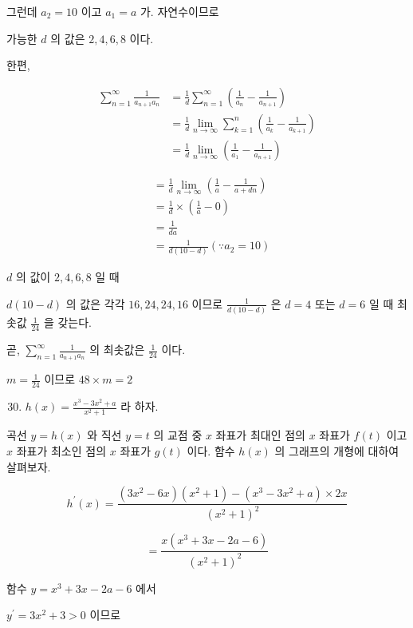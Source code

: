 \documentclass[10pt]{article}
\begin{document}
그런데 $a_{2}=10$ 이고 $a_{1}=a$ 가. 자연수이므로

가능한 $d$ 의 값은 $2,4,6,8$ 이다.

한편,

\[
\begin{aligned}
\sum_{n=1}^{\infty} \frac{1}{a_{n+1} a_{n}} & =\frac{1}{d} \sum_{n=1}^{\infty}\left(\frac{1}{a_{n}}-\frac{1}{a_{n+1}}\right) \\
& =\frac{1}{d} \lim _{n \rightarrow \infty} \sum_{k=1}^{n}\left(\frac{1}{a_{k}}-\frac{1}{a_{k+1}}\right) \\
& =\frac{1}{d} \lim _{n \rightarrow \infty}\left(\frac{1}{a_{1}}-\frac{1}{a_{n+1}}\right)
\end{aligned}
\]

\[
\begin{aligned}
& =\frac{1}{d} \lim _{n \rightarrow \infty}\left(\frac{1}{a}-\frac{1}{a+d n}\right) \\
& =\frac{1}{d} \times\left(\frac{1}{a}-0\right) \\
& =\frac{1}{d a} \\
& =\frac{1}{d(10-d)}\left(\because a_{2}=10\right)
\end{aligned}
\]

$d$ 의 값이 $2,4,6,8$ 일 때

$d(10-d)$ 의 값은 각각 $16,24,24,16$ 이므로 $\frac{1}{d(10-d)}$ 은 $d=4$ 또는 $d=6$ 일 때 최솟값 $\frac{1}{24}$ 을 갖는다.

곧, $\sum_{n=1}^{\infty} \frac{1}{a_{n+1} a_{n}}$ 의 최솟값은 $\frac{1}{24}$ 이다.

$m=\frac{1}{24}$ 이므로 $48 \times m=2$

\begin{enumerate}
  \setcounter{enumi}{29}
  \item $h(x)=\frac{x^{3}-3 x^{2}+a}{x^{2}+1}$ 라 하자.
\end{enumerate}

곡선 $y=h(x)$ 와 직선 $y=t$ 의 교점 중 $x$ 좌표가 최대인 점의 $x$ 좌표가 $f(t)$ 이고 $x$ 좌표가 최소인 점의 $x$ 좌표가 $g(t)$ 이다. 함수 $h(x)$ 의 그래프의 개형에 대하여 살펴보자.

\[
h^{\prime}(x)=\frac{\left(3 x^{2}-6 x\right)\left(x^{2}+1\right)-\left(x^{3}-3 x^{2}+a\right) \times 2 x}{\left(x^{2}+1\right)^{2}}
\]

\[
=\frac{x\left(x^{3}+3 x-2 a-6\right)}{\left(x^{2}+1\right)^{2}}
\]

함수 $y=x^{3}+3 x-2 a-6$ 에서

$y^{\prime}=3 x^{2}+3>0$ 이므로
\end{document}
